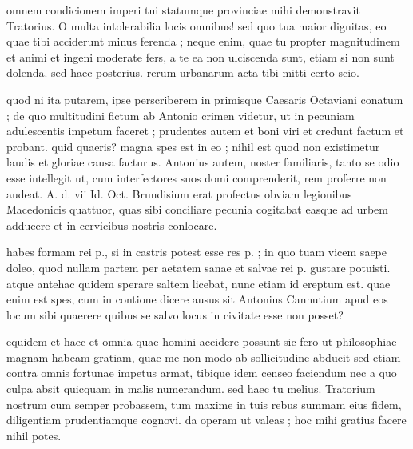 


 omnem condicionem imperi tui statumque provinciae mihi demonstravit Tratorius. O multa intolerabilia locis omnibus! sed quo tua maior dignitas, eo quae tibi acciderunt minus ferenda ; neque enim, quae tu propter magnitudinem et animi et ingeni moderate fers, a te ea non ulciscenda sunt, etiam si non sunt dolenda. sed haec posterius. rerum urbanarum acta tibi mitti certo scio.

 quod ni ita putarem, ipse perscriberem in primisque Caesaris Octaviani conatum ; de quo multitudini fictum ab Antonio crimen videtur, ut in pecuniam adulescentis impetum faceret ; prudentes autem et boni viri et credunt factum et probant. quid quaeris? magna spes est in eo ; nihil est quod non existimetur laudis et gloriae causa facturus. Antonius autem, noster familiaris, tanto se odio esse intellegit ut, cum interfectores suos domi comprenderit, rem proferre non audeat. A. d. vii Id. Oct. Brundisium erat profectus obviam legionibus Macedonicis quattuor, quas sibi conciliare pecunia cogitabat easque ad urbem adducere et in cervicibus nostris conlocare.

 habes formam rei p., si in castris potest esse res p. ; in quo tuam vicem saepe doleo, quod nullam partem per aetatem sanae et salvae rei p. gustare potuisti. atque antehac quidem sperare saltem licebat, nunc etiam id ereptum est. quae enim est spes, cum in contione dicere ausus sit Antonius Cannutium apud eos locum sibi quaerere quibus se salvo locus in civitate esse non posset?

 equidem et haec et omnia quae homini accidere possunt sic fero ut philosophiae magnam habeam gratiam, quae me non modo ab sollicitudine abducit sed etiam contra omnis fortunae impetus armat, tibique idem censeo faciendum nec a quo culpa absit quicquam in malis numerandum. sed haec tu melius. Tratorium nostrum cum semper probassem, tum maxime in tuis rebus summam eius fidem, diligentiam prudentiamque cognovi. da operam ut valeas ; hoc mihi gratius facere nihil potes.
